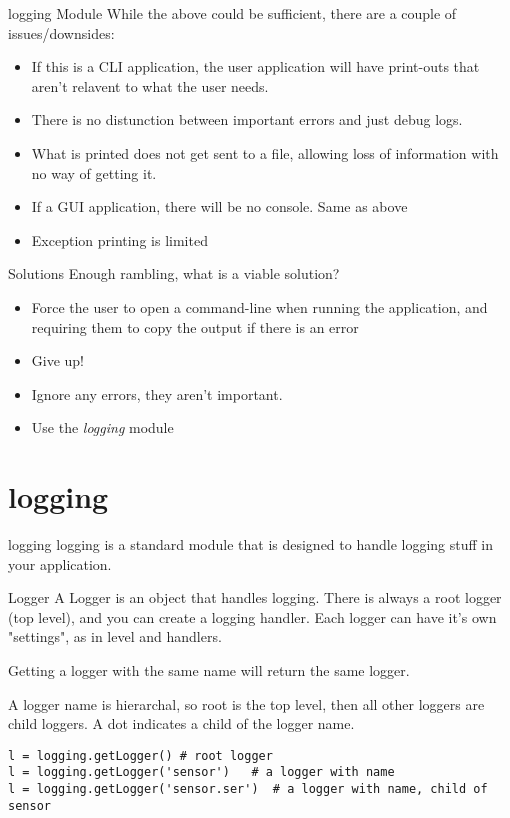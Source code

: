 \begin{frame}{logging Module}
  While the above could be sufficient, there are a couple of issues/downsides:
  \begin{itemize}
    \item If this is a CLI application, the user application will have print-outs that aren't relavent to what the user needs.
    \item There is no distunction between important errors and just debug logs.
    \item What is printed does not get sent to a file, allowing loss of information with no way of getting it.
    \item If a GUI application, there will be no console. Same as above
    \item Exception printing is limited
  \end{itemize}
\end{frame}

\begin{frame}{Solutions}
  Enough rambling, what is a viable solution?\pause
  \begin{itemize}
    \item Force the user to open a command-line when running the application, and requiring them to copy the output if there is an error\pause
    \item Give up!\pause
    \item Ignore any errors, they aren't important.\pause
    \item Use the \textit{logging} module
  \end{itemize}
\end{frame}

\section{logging}

\begin{frame}{logging}
  logging is a standard module that is designed to handle logging stuff in your application.
\end{frame}

\begin{frame}[containsverbatim]{Logger}
  A Logger is an object that handles logging. There is always a root logger (top level), and you can create a logging handler. Each logger can have it's own "settings", as in level and handlers.

  Getting a logger with the same name will return the same logger.

  A logger name is hierarchal, so root is the top level, then all other loggers are child loggers. A dot indicates a child of the logger name.
  \begin{verbatim}
l = logging.getLogger() # root logger
l = logging.getLogger('sensor')   # a logger with name
l = logging.getLogger('sensor.ser')  # a logger with name, child of sensor
\end{verbatim}
\end{frame}

